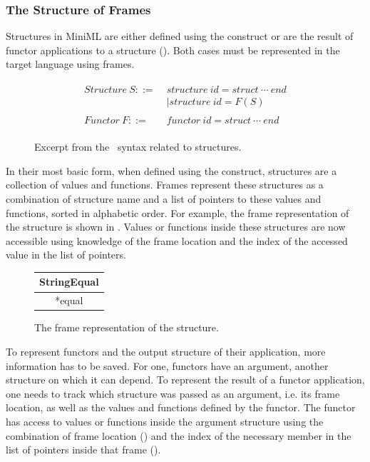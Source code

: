 \subsubsection{The Structure of Frames \label{sec:StructureOfFrames}}
Structures in MiniML are either defined using the  construct or are the result of functor applications to a structure ().
Both cases must be represented in the target language using frames.

\begin{figure}[htb]
\begin{align*}
\begin{aligned}
\mathit{Structure\ }S ::=\; &\mathit{structure\ } \mathit{id} = \mathit{struct\ }\cdots \mathit{\ end}\\
& |\mathit{structure\ } \mathit{id} = F(S)\\
\\
\mathit{Functor\ }F ::=\;&\mathit{functor\ } \mathit{id} = \mathit{struct\ }\cdots\mathit{\ end}
\end{aligned}
\end{align*}
\caption[\MiniML\ Structure Syntax(excerpt)]{Excerpt from the \MiniML\ syntax related to structures\label{fig:FunctorGrammarExcerpt}.}
\end{figure}

In their most basic form, when defined using the  construct, structures are a collection of values and functions.
Frames represent these structures as a combination of structure name and a list of pointers to these values and functions, sorted in alphabetic order.
For example, the frame representation of the  structure is shown in .
Values or functions inside these structures are now accessible using knowledge of the frame location and the index of the accessed value in the list of pointers.

\begin{figure}[H]
\centering
\begin{tabular}{|c|}
\hline
StringEqual \\
\hline
*equal \\
\hline
\end{tabular}
\caption[Frame Representation Example: StringEqual]{The frame representation of the  structure.\label{fig:StringEqualFrame}}
\end{figure}

To represent functors and the output structure of their application, more information has to be saved. 
For one, functors have an argument, another structure on which it can depend.
To represent the result of a functor application, one needs to track which structure was passed as an argument, i.e. its frame location, as well as the values and functions defined by the functor.
The functor has access to values or functions inside the argument structure using the combination of frame location () and the index of the necessary member in the list of pointers inside that frame ().

